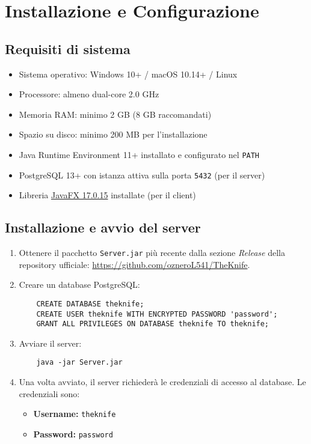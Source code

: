 \section{Installazione e Configurazione}
\label{cap:installazione}
\subsection{Requisiti di sistema}
\begin{itemize}
    \item Sistema operativo: Windows 10+ / macOS 10.14+ / Linux
    \item Processore: almeno dual-core 2.0 GHz
    \item Memoria RAM: minimo 2 GB (8 GB raccomandati)
    \item Spazio su disco: minimo 200 MB per l'installazione
    \item Java Runtime Environment 11+ installato e configurato nel \texttt{PATH}
    \item PostgreSQL 13+ con istanza attiva sulla porta \texttt{5432} (per il server)
    \item Libreria \href{https://gluonhq.com/products/javafx/}{JavaFX 17.0.15} installate (per il client)
\end{itemize}

\subsection{Installazione e avvio del server}
\begin{enumerate}
    \item Ottenere il pacchetto \texttt{Server.jar} più recente 
    dalla sezione \emph{Release} della repository ufficiale: \href{https://github.com/ozneroL541/TheKnife}{https://github.com/ozneroL541/TheKnife}.
    \item Creare un database PostgreSQL:
    \begin{verbatim}
    CREATE DATABASE theknife;
    CREATE USER theknife WITH ENCRYPTED PASSWORD 'password';
    GRANT ALL PRIVILEGES ON DATABASE theknife TO theknife;
    \end{verbatim}
    \item Avviare il server:
    \begin{verbatim}
    java -jar Server.jar
    \end{verbatim}
    \item Una volta avviato, il server richiederà le credenziali di accesso al database.
    Le credenziali sono:
    \begin{itemize}
        \item \textbf{Username:} \texttt{theknife}
        \item \textbf{Password:} \texttt{password}
    \end{itemize}
\end{enumerate}

